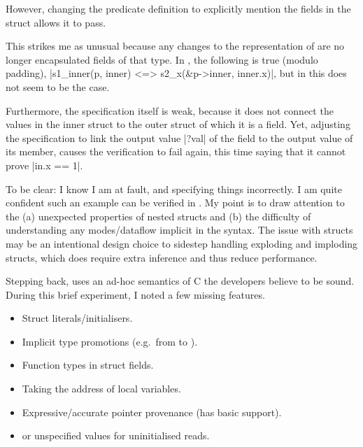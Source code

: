 
However, changing the predicate definition to explicitly mention the fields in
the  struct allows it to pass.

This strikes me as unusual because any changes to the representation of
 are no longer encapsulated fields of that type. In ,
the following is true (modulo padding),
\cninline[breaklines]|s1_inner(p, inner) <=> s2_x(&p->inner, inner.x)|, %
 but in  this does not seem
to be the case.

Furthermore, the specification itself is weak, because it does not connect the
values in the inner struct to the outer struct of which it is a field. Yet,
adjusting the specification to link the output value \cninline|?val| of the
field to the output value of its member, causes the verification to fail again,
this time saying that it cannot prove \cninline|in.x == 1|.


To be clear: I know I am at fault, and specifying things incorrectly. I am
quite confident such an example can be verified in . My point is
to draw attention to the (a) unexpected properties of nested structs and (b)
the difficulty of understanding any modes/dataflow implicit in the syntax. The
issue with structs may be an intentional design choice to sidestep handling
exploding and imploding structs, which does require extra inference and thus
reduce performance.

Stepping back,  uses an ad-hoc semantics of C the developers
believe to be sound. During this brief experiment, I noted a few missing
features.
\begin{itemize}
    \item Struct literals/initialisers.
    \item Implicit type promotions (e.g.\ from  to
        ).
    \item Function types in struct fields.
    \item Taking the address of local variables.
    \item Expressive/accurate pointer provenance (has basic support).
    \item {} or unspecified values for uninitialised reads.
\end{itemize}

